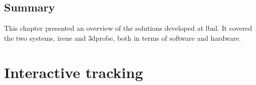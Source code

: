 \section{Summary}

This chapter presented an overview of the solutions developed at \gls{lbnl}. It covered the two systems, \gls{irene} and \gls{3dprobe}, both in terms of software and hardware.

\chapter{Interactive tracking}












%

%



